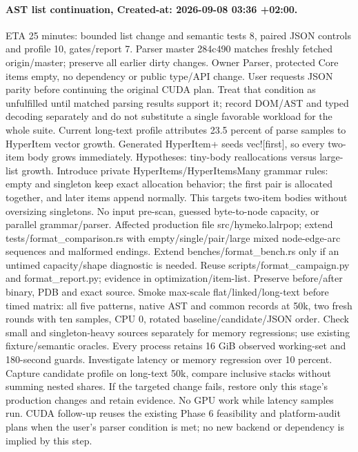\documentclass[11pt,a4paper]{article}
\begin{document}
\paragraph{AST list continuation, Created-at: 2026-09-08 03:36 +02:00.}
ETA 25 minutes: bounded list change and semantic tests 8, paired JSON controls
and profile 10, gates/report 7. Parser master 284c490 matches freshly fetched
origin/master; preserve all earlier dirty changes. Owner Parser, protected Core
items empty, no dependency or public type/API change. User requests JSON parity
before continuing the original CUDA plan. Treat that condition as unfulfilled
until matched parsing results support it; record DOM/AST and typed decoding
separately and do not substitute a single favorable workload for the whole suite.
Current long-text profile attributes 23.5 percent of parse samples to HyperItem
vector growth. Generated HyperItem+ seeds vec![first], so every two-item body
grows immediately. Hypotheses: tiny-body reallocations versus large-list growth.
Introduce private HyperItems/HyperItemsMany grammar rules: empty and singleton
keep exact allocation behavior; the first pair is allocated together, and later
items append normally. This targets two-item bodies without oversizing singletons.
No input pre-scan, guessed byte-to-node capacity, or parallel grammar/parser.
Affected production file src/hymeko.lalrpop; extend tests/format\_comparison.rs
with empty/single/pair/large mixed node-edge-arc sequences and malformed endings.
Extend benches/format\_bench.rs only if an untimed capacity/shape diagnostic is
needed. Reuse scripts/format\_campaign.py and format\_report.py; evidence in
optimization/item-list. Preserve before/after binary, PDB and exact source.
Smoke max-scale flat/linked/long-text before timed matrix: all five patterns,
native AST and common records at 50k, two fresh rounds with ten samples, CPU 0,
rotated baseline/candidate/JSON order. Check small and singleton-heavy sources
separately for memory regressions; use existing fixture/semantic oracles.
Every process retains 16 GiB observed working-set and 180-second guards.
Investigate latency or memory regression over 10 percent. Capture candidate
profile on long-text 50k, compare inclusive stacks without summing nested shares.
If the targeted change fails, restore only this stage's production changes and
retain evidence. No GPU work while latency samples run. CUDA follow-up reuses
the existing Phase 6 feasibility and platform-audit plans when the user's
parser condition is met; no new backend or dependency is implied by this step.
\end{document}
